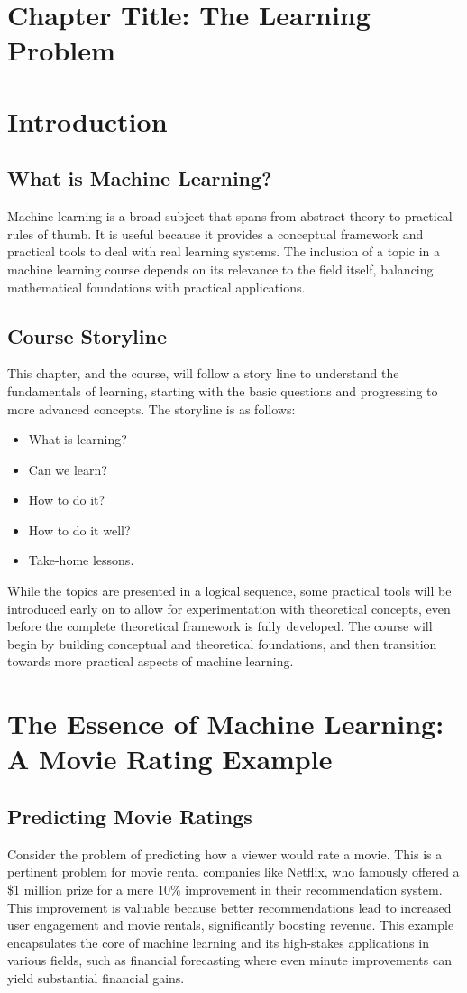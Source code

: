 \documentclass{article}
\begin{document}
\sloppy

\section*{Chapter Title: The Learning Problem}

\section{Introduction}
\subsection{What is Machine Learning?}
Machine learning is a broad subject that spans from abstract theory to practical rules of thumb. It is useful because it provides a conceptual framework and practical tools to deal with real learning systems. The inclusion of a topic in a machine learning course depends on its relevance to the field itself, balancing mathematical foundations with practical applications.

\subsection{Course Storyline}
This chapter, and the course, will follow a story line to understand the fundamentals of learning, starting with the basic questions and progressing to more advanced concepts. The storyline is as follows:
\begin{itemize}
    \item What is learning?
    \item Can we learn?
    \item How to do it?
    \item How to do it well?
    \item Take-home lessons.
\end{itemize}
While the topics are presented in a logical sequence, some practical tools will be introduced early on to allow for experimentation with theoretical concepts, even before the complete theoretical framework is fully developed. The course will begin by building conceptual and theoretical foundations, and then transition towards more practical aspects of machine learning.

\section{The Essence of Machine Learning: A Movie Rating Example}
\subsection{Predicting Movie Ratings}
Consider the problem of predicting how a viewer would rate a movie. This is a pertinent problem for movie rental companies like Netflix, who famously offered a \$1 million prize for a mere 10\% improvement in their recommendation system. This improvement is valuable because better recommendations lead to increased user engagement and movie rentals, significantly boosting revenue. This example encapsulates the core of machine learning and its high-stakes applications in various fields, such as financial forecasting where even minute improvements can yield substantial financial gains.
\end{document}
